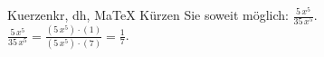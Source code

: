 \begin{MAufgabe}{Kuerzen}{kr, dh, MaTeX}
K\"urzen Sie soweit m\"oglich: $\frac{5\, x^5}{35\, x^5}$.\\ 
\ifLsg\MLoesung
\quad $\frac{5\, x^5}{35\, x^5}=\frac{(5\, x^5)\cdot(1)}{(5\, x^5)\cdot(7)}=\frac{1}{7}$.\else\relax\fi
 \end{MAufgabe}